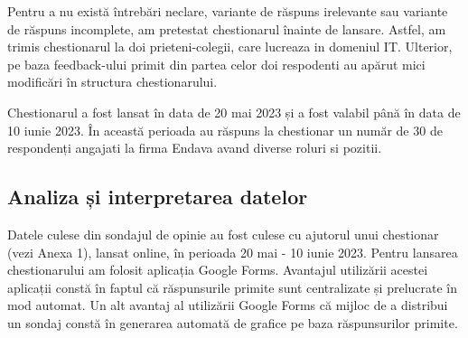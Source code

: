 \documentclass[a4paper, 12pt]{article}
\begin{document}
	\quad Pentru a nu există întrebări neclare, variante de răspuns irelevante sau variante de răspuns incomplete, am pretestat chestionarul înainte de lansare. Astfel, am trimis chestionarul la doi prieteni-colegii, care  lucreaza in domeniul  IT. Ulterior, pe baza feedback-ului primit din partea celor doi respodenti au apărut mici modificări în structura chestionarului.

	\quad  Chestionarul a fost lansat în data de 20 mai 2023 și a fost valabil până în data de 10 iunie 2023. În această perioada au răspuns la chestionar un număr de 30 de respondenți angajati la firma Endava avand diverse roluri si pozitii.

	\subsection{Analiza și interpretarea datelor}

	\qquad\space Datele culese din sondajul de opinie au fost culese cu ajutorul unui chestionar (vezi Anexa 1), lansat online, în perioada 20 mai - 10 iunie 2023. Pentru lansarea chestionarului am folosit aplicația Google Forms. Avantajul utilizării acestei aplicații constă în faptul că răspunsurile primite sunt centralizate și prelucrate în mod automat. Un alt avantaj al utilizării Google Forms că mijloc de a distribui un sondaj constă în generarea automată de grafice pe baza răspunsurilor primite. 	
\end{document}
